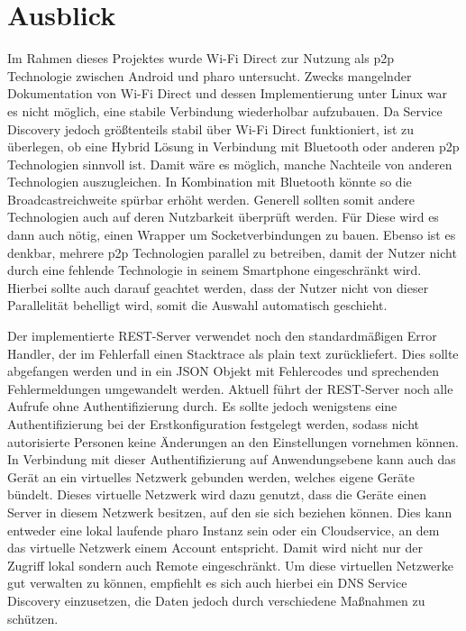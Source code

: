 \section{Ausblick}
	Im Rahmen dieses Projektes wurde Wi-Fi Direct zur Nutzung als p2p Technologie zwischen Android und pharo untersucht. Zwecks mangelnder Dokumentation von Wi-Fi Direct und dessen Implementierung unter Linux war es nicht möglich, eine stabile Verbindung wiederholbar aufzubauen. Da Service Discovery jedoch größtenteils stabil über Wi-Fi Direct funktioniert, ist zu überlegen, ob eine Hybrid Lösung in Verbindung mit Bluetooth oder anderen p2p Technologien sinnvoll ist. Damit wäre es möglich, manche Nachteile von anderen Technologien auszugleichen. In Kombination mit Bluetooth könnte so die Broadcastreichweite spürbar erhöht werden. Generell sollten somit andere Technologien auch auf deren Nutzbarkeit überprüft werden. Für Diese wird es dann auch nötig, einen Wrapper um Socketverbindungen zu bauen.
	Ebenso ist es denkbar, mehrere p2p Technologien parallel zu betreiben, damit der Nutzer nicht durch eine fehlende Technologie in seinem Smartphone eingeschränkt wird. Hierbei sollte auch darauf geachtet werden, dass der Nutzer nicht von dieser Parallelität behelligt wird, somit die Auswahl automatisch geschieht.
	
	Der implementierte REST-Server verwendet noch den standardmäßigen Error Handler, der im Fehlerfall einen Stacktrace als plain text zurückliefert. Dies sollte abgefangen werden und in ein JSON Objekt mit Fehlercodes und sprechenden Fehlermeldungen umgewandelt werden. Aktuell führt der REST-Server noch alle Aufrufe ohne Authentifizierung durch. Es sollte jedoch wenigstens eine Authentifizierung bei der Erstkonfiguration festgelegt werden, sodass nicht autorisierte Personen keine Änderungen an den Einstellungen vornehmen können.
	In Verbindung mit dieser Authentifizierung auf Anwendungsebene kann auch das Gerät an ein virtuelles Netzwerk gebunden werden, welches eigene Geräte bündelt. Dieses virtuelle Netzwerk wird dazu genutzt, dass die Geräte einen Server in diesem Netzwerk besitzen, auf den sie sich beziehen können. Dies kann entweder eine lokal laufende pharo Instanz sein oder ein Cloudservice, an dem das virtuelle Netzwerk einem Account entspricht. Damit wird nicht nur der Zugriff lokal sondern auch Remote eingeschränkt. Um diese virtuellen Netzwerke gut verwalten zu können, empfiehlt es sich auch hierbei ein DNS Service Discovery einzusetzen, die Daten jedoch durch verschiedene Maßnahmen zu schützen.\cite[S.8]{AI-Kaiser2}
	
